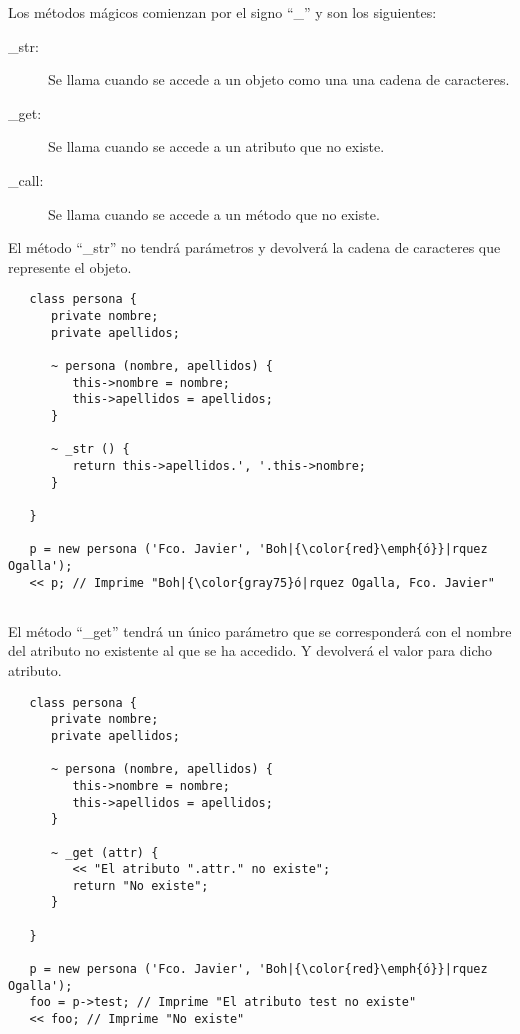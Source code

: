 Los métodos mágicos comienzan por el signo ``\_'' y son los siguientes: 

\begin{description}
\item[\_str:] Se llama cuando se accede a un objeto como una una cadena de caracteres.
\item[\_get:] Se llama cuando se accede a un atributo que no existe.
\item[\_call:] Se llama cuando se accede a un método que no existe.
\end{description}

El método ``\_str'' no tendrá parámetros y devolverá la cadena de caracteres que
represente el objeto. 

\begin{lstlisting}
   class persona {
      private nombre;
      private apellidos;
      
      ~ persona (nombre, apellidos) {
         this->nombre = nombre;
         this->apellidos = apellidos;
      }
      
      ~ _str () {
         return this->apellidos.', '.this->nombre;
      }
      
   }
   
   p = new persona ('Fco. Javier', 'Boh|{\color{red}\emph{ó}}|rquez Ogalla');
   << p; // Imprime "Boh|{\color{gray75}ó|rquez Ogalla, Fco. Javier"
   
\end{lstlisting}

El método ``\_get'' tendrá un único parámetro que se corresponderá con 
el nombre del atributo no existente al que se ha accedido. Y devolverá 
el valor para dicho atributo. \\

\begin{lstlisting}
   class persona {
      private nombre;
      private apellidos;
      
      ~ persona (nombre, apellidos) {
         this->nombre = nombre;
         this->apellidos = apellidos;
      }
      
      ~ _get (attr) {
         << "El atributo ".attr." no existe";
         return "No existe";
      }
      
   }
   
   p = new persona ('Fco. Javier', 'Boh|{\color{red}\emph{ó}}|rquez Ogalla');
   foo = p->test; // Imprime "El atributo test no existe"
   << foo; // Imprime "No existe"
\end{lstlisting}


